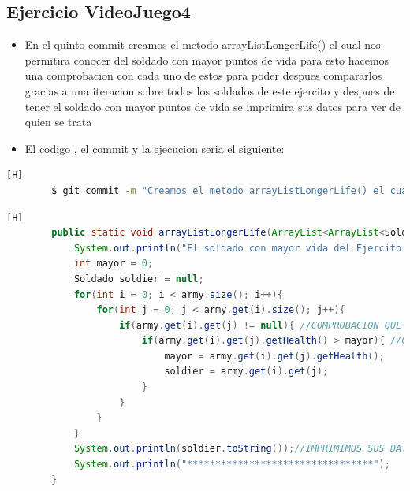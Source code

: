 \documentclass{article}
\begin{document}
	\subsection{Ejercicio VideoJuego4}
	\begin{itemize}	
		\item En el quinto commit creamos el metodo arrayListLongerLife() el cual nos permitira conocer del soldado con mayor puntos de vida para esto hacemos una comprobacion con cada uno de estos para poder despues compararlos gracias a una iteracion sobre todos los soldados de este ejercito y despues de tener el soldado con mayor puntos de vida se imprimira sus datos para ver de quien se trata 
		\item El codigo , el commit y la ejecucion seria el siguiente:
	\end{itemize}	
	\begin{lstlisting}[language=bash,caption={Commit}][H]
		$ git commit -m "Creamos el metodo arrayListLongerLife() el cual nos permitira conocer del soldado con mas vida del ejercito 1 para esto hacemos una comprobacion con cada uno de estos soldados el cual vamos iterando por cada uno de estos para poder despues compararlos y despues de tener el soldado con mayor puntos de vida se imprimira sus datos para ver de quien se trata"
	\end{lstlisting}	
	\begin{lstlisting}[language=java,caption={Las lineas de codigos del metodo creado:}][H]
		public static void arrayListLongerLife(ArrayList<ArrayList<Soldado>> army, int num){
			System.out.println("El soldado con mayor vida del Ejercito " + num + " es: "); //METODO CREADO PARA PODER PERMITIRNOS A CONOCER EL SOLDADO CON MAYOR VIDA DE CADA EJERCITO 
			int mayor = 0;
			Soldado soldier = null;
			for(int i = 0; i < army.size(); i++){
				for(int j = 0; j < army.get(i).size(); j++){
					if(army.get(i).get(j) != null){ //COMPROBACION QUE HACEMOS PARA PODER DECIR QUE EL CASILLERO DONDE ESTAMOS ES UN SOLDADO QUE EXISTE
						if(army.get(i).get(j).getHealth() > mayor){ //COMPARAMOS PUNTOS DE VIDA DE CADA SOLDADO PARA VER QUIEN ES EL MAYOR 
							mayor = army.get(i).get(j).getHealth();
							soldier = army.get(i).get(j);
						}
					}
				}
			}
			System.out.println(soldier.toString());//IMPRIMIMOS SUS DATOS PARA PODER VER DE QUE SOLDADO SE TRATA 
			System.out.println("*********************************");
		}
	\end{lstlisting}
\end{document}
